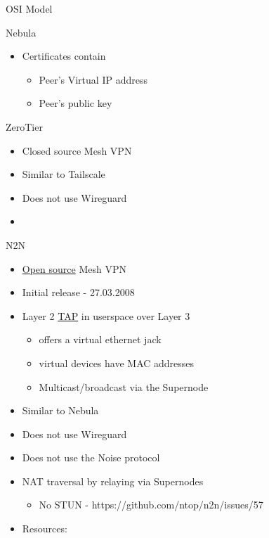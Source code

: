 \begin{frame}[fragile]{OSI Model}
\begin{block}{Nebula}
\begin{itemize}
  \begin{itemize}
  \tightlist
  \item
    Certificates contain

    \begin{itemize}
    \tightlist
    \item
      Peer's Virtual IP address
    \item
      Peer's public key
    \end{itemize}
  \end{itemize}
\end{itemize}
\end{block}

\begin{block}{ZeroTier}
\protect\hypertarget{zerotier}{}
\begin{itemize}
\tightlist
\item
  Closed source Mesh VPN
\item
  Similar to Tailscale
\item
  Does not use Wireguard
\item
\end{itemize}
\end{block}

\begin{block}{N2N}
\protect\hypertarget{n2n}{}
\begin{itemize}
\tightlist
\item
  \href{https://github.com/ntop/n2n}{Open source} Mesh VPN
\item
  Initial release - 27.03.2008
\item
  Layer 2 \href{notes/02021-internet-protocol}{TAP} in userspace over
  Layer 3

  \begin{itemize}
  \tightlist
  \item
    offers a virtual ethernet jack
  \item
    virtual devices have MAC addresses
  \item
    Multicast/broadcast via the Supernode
  \end{itemize}
\item
  Similar to Nebula
\item
  Does not use Wireguard
\item
  Does not use the Noise protocol
\item
  NAT traversal by relaying via Supernodes

  \begin{itemize}
  \tightlist
  \item
    No STUN - https://github.com/ntop/n2n/issues/57
  \end{itemize}
\item
  Resources:


\end{itemize}
\end{block}
\end{frame}
